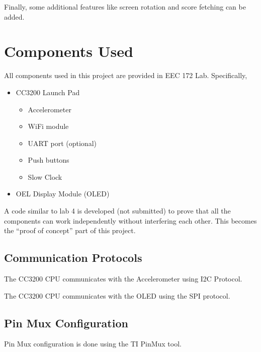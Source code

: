 \documentclass[conference]{IEEEtran}
\begin{document}
Finally, some additional features like screen rotation and score fetching can
 be added.

\section{Components Used}
All components used in this project are provided in EEC 172 Lab. Specifically,
\begin{itemize}
\item CC3200 Launch Pad \cite{cc3200ug}
	\begin{itemize}
	\item Accelerometer \cite{bma222}
	\item WiFi module
	\item UART port (optional)
	\item Push buttons
	\item Slow Clock \cite{cc3200trm}
	\end{itemize}
\item OEL Display Module (OLED) \cite{oled}
\end{itemize}

A code similar to lab 4 is developed (not submitted) to prove that all the
 components can work independently without interfering each other.
 This becomes the ``proof of concept'' part of this project.

\subsection{Communication Protocols}
The CC3200 CPU communicates with the Accelerometer using I2C Protocol.

The CC3200 CPU communicates with the OLED using the SPI protocol.

\subsection{Pin Mux Configuration}
Pin Mux configuration is done using the TI PinMux tool.
\end{document}

